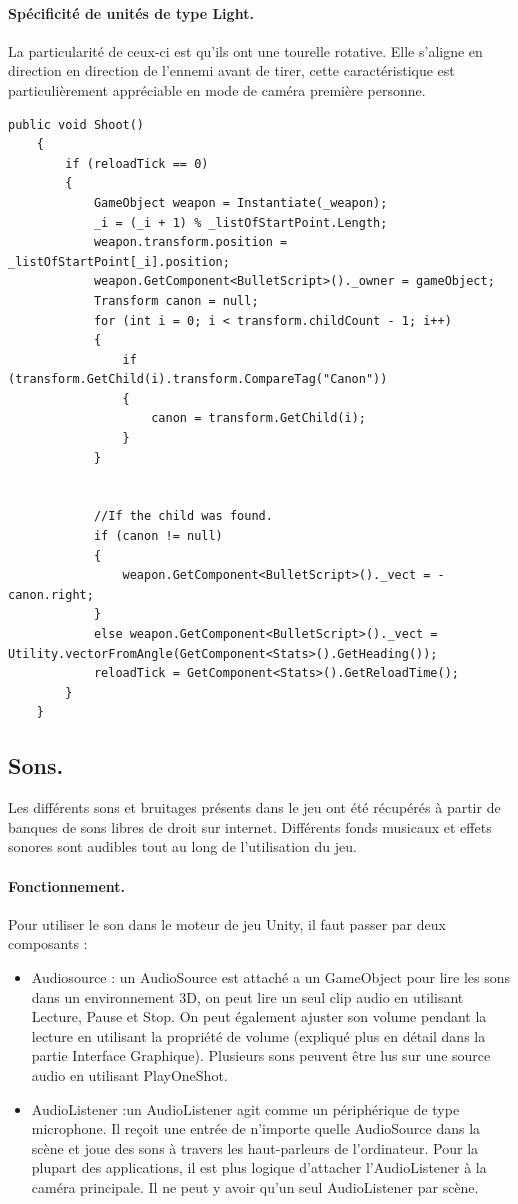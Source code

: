 \documentclass{report}
\begin{document}
\paragraph{Spécificité de unités de type Light.} La particularité de ceux-ci est qu'ils ont une tourelle rotative. Elle s'aligne en direction en direction de l'ennemi avant de tirer, cette caractéristique est particulièrement appréciable en mode de caméra première personne.
 \begin{lstlisting}[language={[Sharp]C},label={lst:ShooterAnimation}, caption= Extrait du code de Shooter.cs]
public void Shoot()
    {
        if (reloadTick == 0)
        {
            GameObject weapon = Instantiate(_weapon);
            _i = (_i + 1) % _listOfStartPoint.Length;
            weapon.transform.position = _listOfStartPoint[_i].position;
            weapon.GetComponent<BulletScript>()._owner = gameObject;
            Transform canon = null;
            for (int i = 0; i < transform.childCount - 1; i++)
            {
                if (transform.GetChild(i).transform.CompareTag("Canon"))
                {
                    canon = transform.GetChild(i);
                }
            }


            //If the child was found.
            if (canon != null)
            {
                weapon.GetComponent<BulletScript>()._vect = -canon.right;
            }
            else weapon.GetComponent<BulletScript>()._vect = Utility.vectorFromAngle(GetComponent<Stats>().GetHeading());
            reloadTick = GetComponent<Stats>().GetReloadTime();
        }
    }
\end{lstlisting}
\subsection{Sons.}
Les différents sons et bruitages présents dans le jeu ont été récupérés à partir de banques de sons libres de droit sur internet.
\newline Différents fonds musicaux et effets sonores sont audibles tout au long de l'utilisation du jeu.
\paragraph{Fonctionnement.}
Pour utiliser le son dans le moteur de jeu Unity, il faut passer par deux composants :
\begin{itemize}
\item Audiosource : un AudioSource est attaché a un GameObject pour lire les sons dans un environnement 3D, on peut lire un seul clip audio en utilisant Lecture, Pause et Stop. On peut également ajuster son volume pendant la lecture en utilisant la propriété de volume (expliqué plus en détail dans la partie Interface Graphique). Plusieurs sons peuvent être lus sur une source audio en utilisant PlayOneShot.
\item AudioListener :un AudioListener agit comme un périphérique de type microphone. Il reçoit une entrée de n'importe quelle AudioSource dans la scène et joue des sons à travers les haut-parleurs de l'ordinateur. Pour la plupart des applications, il est plus logique d'attacher l'AudioListener à la caméra principale. Il ne peut y avoir qu'un seul AudioListener par scène.
\end{itemize}
\end{document}
